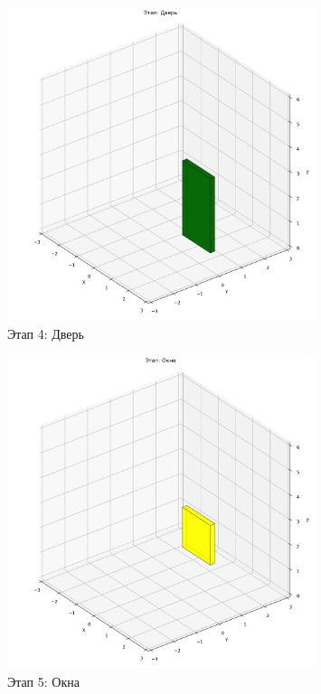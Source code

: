 \begin{figure}[H]
\centering
\includegraphics[width=0.8\textwidth]{images/task8/construction_дверь.png}
\caption{Этап 4: Дверь}
\end{figure}

\begin{figure}[H]
\centering
\includegraphics[width=0.8\textwidth]{images/task8/construction_окна.png}
\caption{Этап 5: Окна}
\end{figure}

